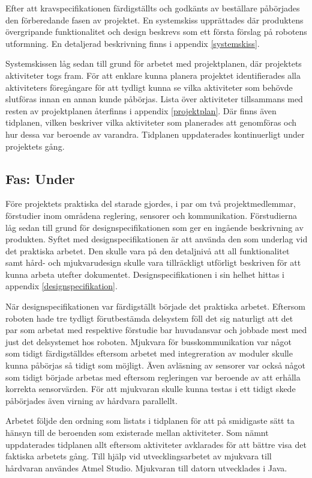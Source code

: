 \documentclass[11pt]{article}
\begin{document}
\begin{flushleft}
Efter att kravspecifikationen färdigställts och godkänts av beställare påbörjades den förberedande fasen av projektet. En systemskiss upprättades där produktens övergripande funktionalitet och design beskrevs som ett första förslag på robotens utformning. En detaljerad beskrivning finns i appendix \ref{systemskiss}. 

Systemskissen låg sedan till grund för arbetet med projektplanen, där projektets aktiviteter togs fram. För att enklare kunna planera projektet identifierades alla aktiviteters föregångare för att tydligt kunna se vilka aktiviteter som behövde slutföras innan en annan kunde påbörjas. Lista över aktiviteter tillsammans med resten av projektplanen återfinns i appendix \ref{projektplan}. Där finns även tidplanen, vilken beskriver vilka aktiviteter som planerades att genomföras och hur dessa var beroende av varandra. Tidplanen uppdaterades kontinuerligt under projektets gång.

\subsection{Fas: Under}
Före projektets praktiska del starade gjordes, i par om två projektmedlemmar, förstudier inom områdena reglering, sensorer och kommunikation. Förstudierna låg sedan till grund för designspecifikationen som ger en ingående beskrivning av produkten. Syftet med designspecifikationen är att använda den som underlag vid det praktiska arbetet. Den skulle vara på den detaljnivå att all funktionalitet samt hård- och mjukvarudesign skulle vara tillräckligt utförligt beskriven för att kunna arbeta utefter dokumentet. Designspecifikationen i sin helhet hittas i appendix \ref{designspecifikation}. 

När designspecifikationen var färdigställt började det praktiska arbetet. Eftersom roboten hade tre tydligt förutbestämda delsystem föll det sig naturligt att det par som arbetat med respektive förstudie bar huvudansvar och jobbade mest med just det delsystemet hos roboten. Mjukvara för busskommunikation var något som tidigt färdigställdes eftersom arbetet med integreration av moduler skulle kunna påbörjas så tidigt som möjligt. Även avläsning av sensorer var också något som tidigt började arbetas med eftersom regleringen var beroende av att erhålla korrekta sensorvärden. För att mjukvaran skulle kunna testas i ett tidigt skede påbörjades även virning av hårdvara parallellt. 

Arbetet följde den ordning som listats i tidplanen för att på smidigaste sätt ta hänsyn till de beroenden som existerade mellan aktiviteter. Som nämnt uppdaterades tidplanen allt eftersom aktiviteter avklarades för att bättre visa det faktiska arbetets gång. Till hjälp vid utvecklingsarbetet av mjukvara till hårdvaran användes Atmel Studio. Mjukvaran till datorn utvecklades i Java. 


\end{flushleft}
\end{document}
